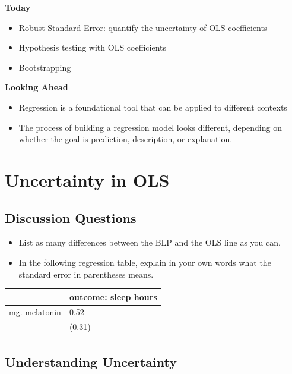 \documentclass[
]{book}
\providecommand{\tightlist}{%
  \setlength{\itemsep}{0pt}\setlength{\parskip}{0pt}}
\theoremstyle{definition}
\theoremstyle{definition}
\theoremstyle{definition}
\theoremstyle{definition}
\theoremstyle{remark}
\begin{document}
\textbf{Today}

\begin{itemize}
\tightlist
\item
  Robust Standard Error: quantify the uncertainty of OLS coefficients
\item
  Hypothesis testing with OLS coefficients
\item
  Bootstrapping
\end{itemize}

\textbf{Looking Ahead}

\begin{itemize}
\tightlist
\item
  Regression is a foundational tool that can be applied to different contexts
\item
  The process of building a regression model looks different, depending on whether the goal is prediction, description, or explanation.
\end{itemize}

\hypertarget{uncertainty-in-ols}{%
\section{Uncertainty in OLS}\label{uncertainty-in-ols}}

\hypertarget{discussion-questions-2}{%
\subsection{Discussion Questions}\label{discussion-questions-2}}

\begin{itemize}
\tightlist
\item
  List as many differences between the BLP and the OLS line as you can.
\item
  In the following regression table, explain in your own words what the standard error in parentheses means.
\end{itemize}

\begin{longtable}[]{@{}ll@{}}
\toprule
& outcome: sleep hours \\
\midrule
\endhead
mg. melatonin & 0.52 \\
& (0.31) \\
\bottomrule
\end{longtable}

\hypertarget{understanding-uncertainty}{%
\subsection{Understanding Uncertainty}\label{understanding-uncertainty}}
\end{document}
